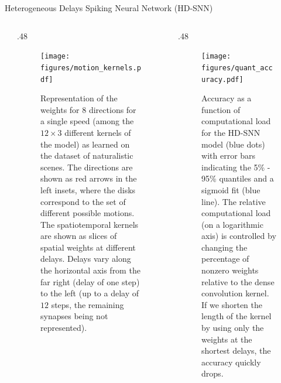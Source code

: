 \documentclass[final]{beamer}
\newlength{\sepwidth}
\newlength{\colwidth}
\newcommand{\separatorcolumn}{\begin{column}{\sepwidth}\end{column}}
\begin{document}
\begin{frame}[t]
\begin{columns}[t]
\begin{column}{\colwidth}
\begin{block}{Heterogeneous Delays Spiking Neural Network (HD-SNN)~\parencite{Grimaldi23BC}}
\begin{columns}[t]
\separatorcolumn

\begin{column}{.48\colwidth}

\begin{figure}
    {\centering
    \texttt{[image: figures/motion\_kernels.pdf]}
    }
    \caption{
    	Representation of the weights for $8$ directions for a single speed (among the $12 \times 3$ different kernels of the model) as learned on the dataset of naturalistic scenes. The directions are shown as red arrows in the left insets, where the disks correspond to the set of different possible motions. The spatiotemporal kernels are shown as slices of spatial weights at different delays. Delays vary along the horizontal axis from the far right (delay of one step) to the left (up to a delay of $12$ steps, the remaining synapses being not represented). %
	}
    \label{fig:kernels}
\end{figure} 
\end{column}
%
\begin{column}{.48\colwidth}
\begin{figure}%
    \centering
    \texttt{[image: figures/quant\_accuracy.pdf]}
    \caption{
        Accuracy as a function of computational load for the HD-SNN model (blue dots) with error bars indicating the 5\% - 95\% quantiles and a sigmoid fit (blue line). The relative computational load (on a logarithmic axis) is controlled by changing the percentage of nonzero weights relative to the dense convolution kernel. If we shorten the length of the kernel by using only the weights at the shortest delays, the accuracy quickly drops. %
        }
    \label{fig:accuracy}
\end{figure}
\end{column}
\end{columns}


\end{block}
\end{column}
\end{columns}
\end{frame}
\end{document}
